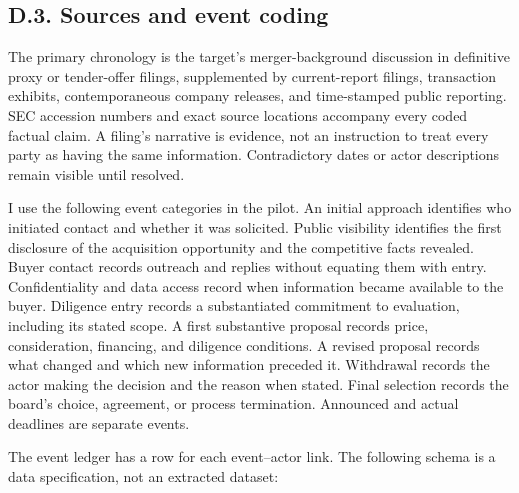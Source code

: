 \documentclass[
  11pt,
]{article}
\begin{document}
\subsection{D.3. Sources and event coding}\label{oa-d-coding}

The primary chronology is the target's merger-background discussion in
definitive proxy or tender-offer filings, supplemented by current-report
filings, transaction exhibits, contemporaneous company releases, and
time-stamped public reporting. SEC accession numbers and exact source
locations accompany every coded factual claim. A filing's narrative is
evidence, not an instruction to treat every party as having the same
information. Contradictory dates or actor descriptions remain visible
until resolved.

I use the following event categories in the pilot. An initial approach
identifies who initiated contact and whether it was solicited. Public
visibility identifies the first disclosure of the acquisition
opportunity and the competitive facts revealed. Buyer contact records
outreach and replies without equating them with entry. Confidentiality
and data access record when information became available to the buyer.
Diligence entry records a substantiated commitment to evaluation,
including its stated scope. A first substantive proposal records price,
consideration, financing, and diligence conditions. A revised proposal
records what changed and which new information preceded it. Withdrawal
records the actor making the decision and the reason when stated. Final
selection records the board's choice, agreement, or process termination.
Announced and actual deadlines are separate events.

The event ledger has a row for each event--actor link. The following
schema is a data specification, not an extracted dataset:
\end{document}
